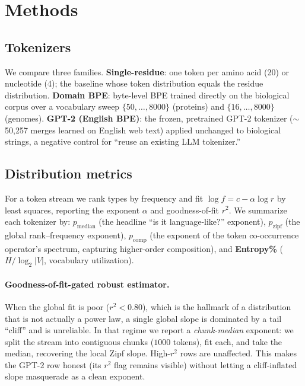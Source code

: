 \documentclass[11pt]{article}
\begin{document}
\section{Methods}
\subsection{Tokenizers}
We compare three families. \textbf{Single-residue}: one token per amino acid (20)
or nucleotide (4); the baseline whose token distribution equals the residue
distribution. \textbf{Domain BPE}: byte-level BPE trained directly on the
biological corpus over a vocabulary sweep $\{50,\dots,8000\}$ (proteins) and
$\{16,\dots,8000\}$ (genomes). \textbf{GPT-2 (English BPE)}: the frozen,
pretrained GPT-2 tokenizer ($\sim$50{,}257 merges learned on English web text)
applied unchanged to biological strings, a negative control for ``reuse an
existing LLM tokenizer.''

\subsection{Distribution metrics}
For a token stream we rank types by frequency and fit
$\log f = c - \alpha \log r$ by least squares, reporting the exponent
$\alpha$ and goodness-of-fit $r^2$. We summarize each tokenizer by:
\textbf{$p_{\text{median}}$} (the headline ``is it language-like?'' exponent),
\textbf{$p_{\text{zipf}}$} (the global rank--frequency exponent),
\textbf{$p_{\text{comp}}$} (the exponent of the token co-occurrence operator's
spectrum, capturing higher-order composition), and \textbf{Entropy\%}
($H/\log_2 |V|$, vocabulary utilization).

\paragraph{Goodness-of-fit-gated robust estimator.}
When the global fit is poor ($r^2 < 0.80$), which is the hallmark of a
distribution that is not actually a power law, a single global slope is
dominated by a tail
``cliff'' and is unreliable. In that regime we report a \emph{chunk-median}
exponent: we split the stream into contiguous chunks ($1000$ tokens), fit each,
and take the median, recovering the local Zipf slope. High-$r^2$ rows are
unaffected. This makes the GPT-2 row honest (its $r^2$ flag remains visible)
without letting a cliff-inflated slope masquerade as a clean exponent.
\end{document}
